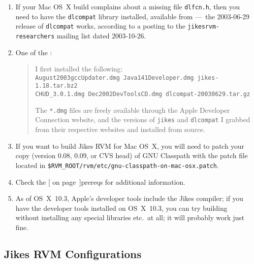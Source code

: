 \begin{enumerate}
\item
If your Mac OS~X build complains about a missing file  \texttt{dlfcn.h}, then 
you need to have the \texttt{dlcompat} library installed, available from 
---~the 2003-06-29 release of \texttt{dlcompat} works, according to a posting to
the \texttt{jikesrvm-researchers} mailing list dated 2003-10-26.

\item
One of the :
\begin{quote}
\raggedright
I first installed the following: \\
\OneCMStrut{}\texttt{August2003gccUpdater.dmg  Java141Developer.dmg jikes-1.18.tar.bz2 \\
\OneCMStrut{}CHUD\_3.0.1.dmg Dec2002DevToolsCD.dmg     dlcompat-20030629.tar.gz \\
}

The \texttt{*.dmg} files are freely available through the Apple
Developer Connection 
website, and the versions of \texttt{jikes} and \texttt{dlcompat} I grabbed from their
respective websites and installed from source.
\end{quote}

\item
If you want to build Jikes RVM for Mac OS~X, you will need to patch
your copy (version 0.08, 0.09, or CVS head) of GNU Classpath with the patch
file located
in \texttt{\$RVM\_\-ROOT/\-rvm/\-etc/\-gnu-classpath-on-mac-osx.patch}.

\item
Check the [ on page~\Pageref]{prereqs} for additional
information. 

\item As of OS~X~10.3, Apple's developer tools include the Jikes
  compiler; if you have the developer tools installed on OS~X~10.3,
  you can try building without installing any special libraries
  etc.\ at all; it will probably work just fine.

\end{enumerate}


\subsection{Jikes RVM Configurations}\label{configs}%
%

